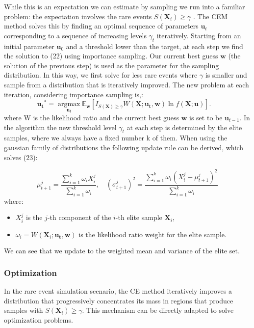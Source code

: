 \documentclass{article}
\begin{document}
While this is an expectation we can estimate by sampling we run into a familiar problem: the expectation involves the rare events $S(\mathbf{X}_i)\geq  \gamma$ .  The CEM method solves this by finding an optimal sequence of parameters $\mathbf{u}_t$  corresponding to a sequence of  increasing levels   $\gamma_t$ iteratively. Starting from an initial parameter $\mathbf{u}_0$   and a threshold lower than the target, at each step we find the solution to (22) using importance sampling. Our current best guess $\mathbf{w}$ (the solution of the previous step) is used as the parameter for the sampling distribution. In this way, we first solve for less rare events where $\gamma$ is smaller and sample from a distribution that is iteratively improved.
The new problem at each iteration, considering importance sampling is,:
\begin{equation}
\mathbf{u_t}^* = \underset{\mathbf{u_t}}{\operatorname{argmax}} \mathbb{E}_{\mathbf{w}}\left[ I_{{S(\mathbf{X}) \geq \gamma}} W(\mathbf{X}; \mathbf{u_t}, \mathbf{w}) \ln f(\mathbf{X}; \mathbf{u}) \right]. \quad 
\end{equation}
where W is the likelihood ratio and the current best guess $\mathbf{w}$ is set to be $\mathbf{u}_{t-1}$.
In the algorithm the new threshold level $\gamma_t$ at each step is determined by the elite samples, where we always have a fixed number k of them. When using the gaussian family of distributions the following update rule can be derived, which solves (23):

\begin{equation}
\mu^{j}_{t+1} = \frac{\sum_{i=1}^{k} \omega_i X^j_i}{\sum_{i=1}^{k} \omega_i}, \quad 
(\sigma^{j}_{t+1})^2 = \frac{\sum_{i=1}^{k} \omega_i (X^j_i - \mu^{j}_{t+1})^2}{\sum_{i=1}^{k} \omega_i}
\end{equation}
where:
\begin{itemize}
    \item $X^j_i$ is the $j$-th component of the $i$-th elite sample $\mathbf{X}_i$,
    \item $\omega_i = W(\mathbf{X}_i; \mathbf{u_t}, \mathbf{w})$ is the likelihood ratio weight for the elite sample.
\end{itemize}
We can see that we update to the weighted  mean and variance of the elite set. 
\subsubsection{Optimization}
In the rare event simulation scenario, the CE method iteratively improves a distribution that progressively concentrates its mass in regions that produce samples with $S(\mathbf{X}_i)\geq \gamma$. This mechanism can be directly  adapted to solve optimization problems. 
\end{document}
